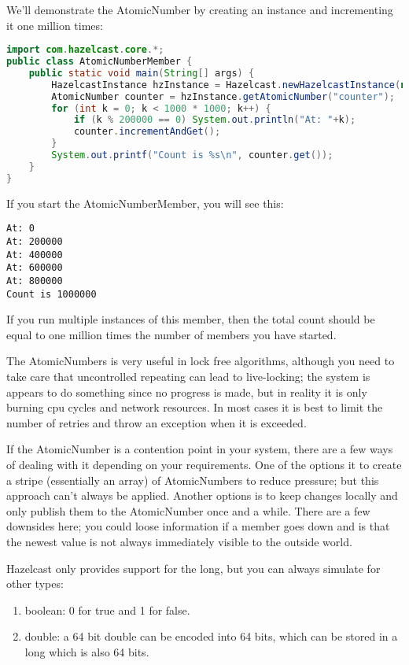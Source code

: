 We'll demonstrate the AtomicNumber by creating an instance and incrementing it one million times:
\begin{lstlisting}[language=java]
import com.hazelcast.core.*;
public class AtomicNumberMember {
    public static void main(String[] args) {
        HazelcastInstance hzInstance = Hazelcast.newHazelcastInstance(null);
        AtomicNumber counter = hzInstance.getAtomicNumber("counter");
        for (int k = 0; k < 1000 * 1000; k++) {
            if (k % 200000 == 0) System.out.println("At: "+k);
            counter.incrementAndGet();
        }
        System.out.printf("Count is %s\n", counter.get());
    }
}
\end{lstlisting}
If you start the AtomicNumberMember, you will see this:
\begin{lstlisting}
At: 0
At: 200000
At: 400000
At: 600000
At: 800000
Count is 1000000
\end{lstlisting}
If you run multiple instances of this member, then the total count should be equal to one million times the number of members you have started.

The AtomicNumbers is very useful in lock free algorithms, although you need to take care that uncontrolled repeating can lead to live-locking; the system is appears to do something since no progress is made, but in reality it is only burning cpu cycles and network resources. In most cases it is best to limit the number of retries and throw an exception when it is exceeded.

If the AtomicNumber is a contention point in your system, there are a few ways of dealing with it depending on your requirements. One of the options it to create a stripe (essentially an array) of AtomicNumbers to reduce pressure; but this approach can't always be applied. Another options is to keep changes locally and only publish them to the AtomicNumber once and a while. There are a few downsides here; you could loose information if a member goes down and is that the newest value is not always immediately visible to the outside world. 

Hazelcast only provides support for the long, but you can always simulate for other types:
\begin{enumerate}
\item boolean: 0 for true and 1 for false.
\item double: a 64 bit double can be encoded into 64 bits, which can be stored in a long 
      which is also 64 bits.
\end{enumerate}


